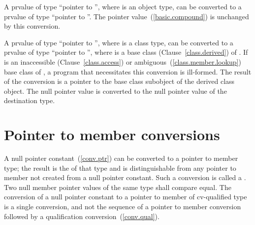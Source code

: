 \pnum
A prvalue of type ``pointer to  '', where 
is an object type, can be converted to a prvalue of type ``pointer to
 ''.
The pointer value~(\ref{basic.compound}) is unchanged by this conversion.

\pnum
A prvalue of type ``pointer to  '', where 
is a class type, can be converted to a prvalue of type ``pointer to
 '', where  is a base class
(Clause~\ref{class.derived}) of . If  is an
inaccessible (Clause~\ref{class.access}) or
ambiguous~(\ref{class.member.lookup}) base class of , a program
that necessitates this conversion is ill-formed. The result of the
conversion is a pointer to the base class subobject of the derived class
object. The null pointer value is converted to the null pointer value of
the destination type.

\section[conv.mem]{Pointer to member conversions}

\pnum
{}%
%
%
A null pointer constant~(\ref{conv.ptr}) can be converted to a pointer
to member type; the result is the 
of that type and is distinguishable from any pointer to member not
created from a null pointer constant.
Such a conversion is called a .
Two null member pointer values of
the same type shall compare equal. The conversion of a null pointer
constant to a pointer to member of cv-qualified type is a single
conversion, and not the sequence of a pointer to member conversion
followed by a qualification conversion~(\ref{conv.qual}).

